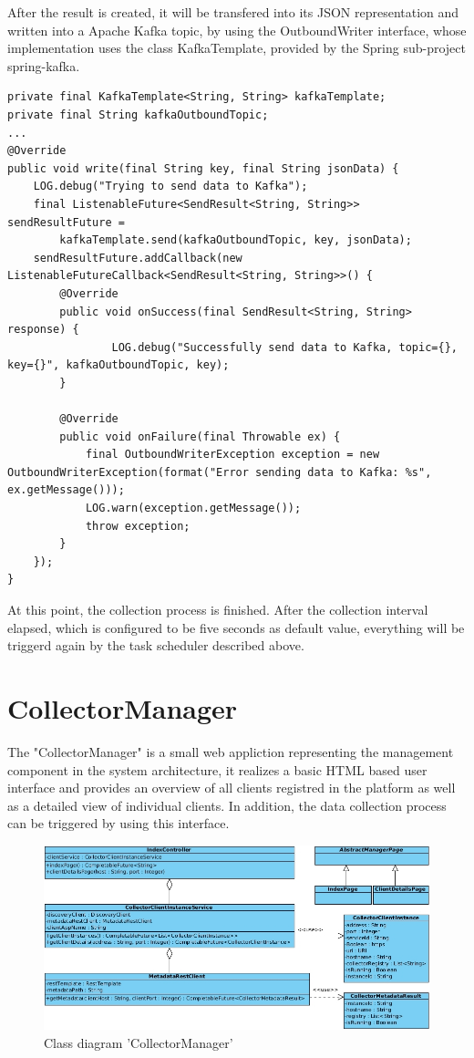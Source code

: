 After the result is created, it will be transfered into its JSON representation and written into a Apache Kafka topic, by using
the OutboundWriter interface, whose implementation uses the class KafkaTemplate, provided by the Spring sub-project spring-kafka.

\begin{lstlisting}[caption={"KafkaOutboundWriter", Send data}, captionpos=b, label={lst:outbound-writer}]
private final KafkaTemplate<String, String> kafkaTemplate;
private final String kafkaOutboundTopic;
...
@Override
public void write(final String key, final String jsonData) {
    LOG.debug("Trying to send data to Kafka");
    final ListenableFuture<SendResult<String, String>> sendResultFuture =
        kafkaTemplate.send(kafkaOutboundTopic, key, jsonData);
    sendResultFuture.addCallback(new ListenableFutureCallback<SendResult<String, String>>() {
        @Override
        public void onSuccess(final SendResult<String, String> response) {
                LOG.debug("Successfully send data to Kafka, topic={}, key={}", kafkaOutboundTopic, key);
        }

        @Override
        public void onFailure(final Throwable ex) {
            final OutboundWriterException exception = new OutboundWriterException(format("Error sending data to Kafka: %s", ex.getMessage()));
            LOG.warn(exception.getMessage());
            throw exception;
        }
    });
}
\end{lstlisting}
At this point, the collection process is finished. After the collection interval elapsed, which is configured to be five seconds as
default value, everything will be triggerd again by the task scheduler described above.

\section{CollectorManager}

The "CollectorManager" is a small web appliction representing the management component in the system architecture, it
realizes a basic HTML based user interface and provides an overview of all clients registred in the platform as well as a
detailed view of individual clients. In addition, the data collection process can be triggered by using this interface.

\begin{figure}[H]
	\centering
	\includegraphics[width=1.0\textwidth]{../uml/class-collector-manager.jpg}
	\caption{Class diagram 'CollectorManager'}
	\label{class-diagram-collector-manager}
\end{figure}

